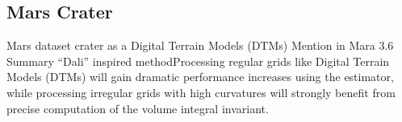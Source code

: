
\subsection{Mars Crater}
Mars dataset crater as a Digital Terrain Models (DTMs) Mention in Mara 3.6
Summary “Dali” inspired methodProcessing regular grids like Digital Terrain
Models (DTMs) will gain dramatic performance increases using the estimator,
while processing irregular grids with high curvatures will strongly benefit
from precise computation of the volume integral invariant.~\cite[p.~143]{Mara12}

